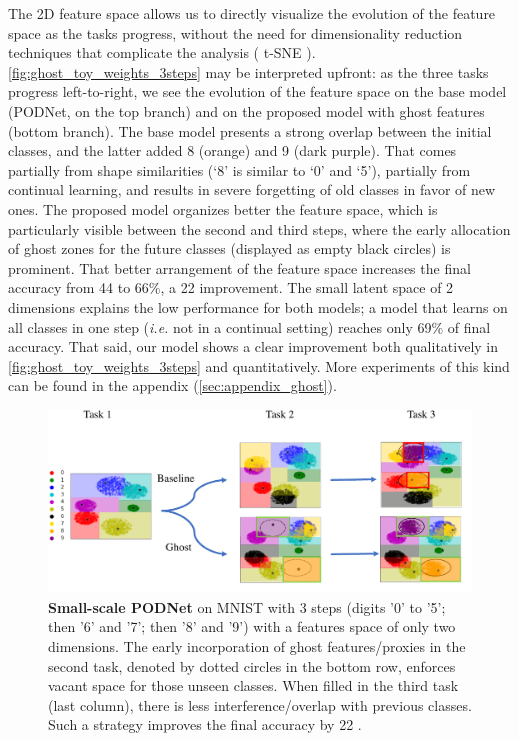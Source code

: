 The 2D feature space allows us to directly visualize the evolution of the feature space as the tasks
progress, without the need for dimensionality reduction techniques that complicate the analysis (\eg
t-SNE \citep{maaten2008tsne}). \autoref{fig:ghost_toy_weights_3steps} may be interpreted upfront: as
the three tasks progress left-to-right, we see the evolution of the feature space on the base model
(PODNet, on the top branch) and on the proposed model with ghost features (bottom branch). The base
model presents a strong overlap between the initial classes, and the latter added  8
({\color{orange}orange}) and 9 ({\color{violet}dark purple}). That comes partially from shape
similarities (‘8’ is similar to ‘0’ and ‘5’), partially from continual learning, and results in
severe forgetting of old classes in favor of new ones. The proposed model organizes better the
feature space, which is particularly visible between the second and third steps, where the early
allocation of ghost zones for the future classes (displayed as empty black circles) is prominent.
That better arrangement of the feature space increases the final accuracy from 44 to 66\%, a 22 \pp
improvement. The small latent space of 2 dimensions explains the low performance for both models; a
model that learns on all classes in one step (\textit{i.e.} not in a continual setting) reaches only
69\% of final accuracy. That said, our model shows a clear improvement both qualitatively in
\autoref{fig:ghost_toy_weights_3steps} and quantitatively. More experiments of this kind can be
found in the appendix (\autoref{sec:appendix_ghost}).

\begin{figure}
    \centering
    \includegraphics[width=0.8\linewidth]{images/ghost/toy_model_6_2_2.pdf}
    \caption{\textbf{Small-scale PODNet} on MNIST with 3 steps (digits '0' to '5'; then '6' and '7';
        then '8' and '9') with a features space of only two dimensions. The early incorporation of
        ghost features/proxies in the second task, denoted by dotted circles in the bottom row,
        enforces vacant space for those unseen classes. When filled in the third task (last column),
        there is less interference/overlap with previous classes. Such a strategy improves the final
        accuracy by 22 \pp.}
    \label{fig:ghost_toy_weights_3steps}
\end{figure}

